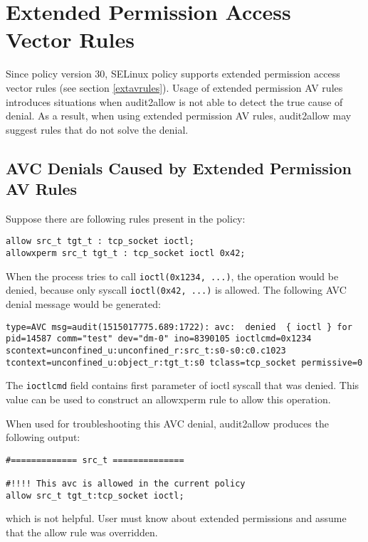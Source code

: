 \section{Extended Permission Access Vector Rules}
Since policy version 30, SELinux policy supports extended permission access
vector rules (see section \ref{extavrules}). Usage of extended permission AV
rules introduces situations when audit2allow is not able to detect the true
cause of denial. As a result, when using extended permission AV rules,
audit2allow may suggest rules that do not solve the denial.

\subsection{AVC Denials Caused by Extended Permission AV Rules}
Suppose there are following rules present in the policy:
\begin{lstlisting}
allow src_t tgt_t : tcp_socket ioctl;
allowxperm src_t tgt_t : tcp_socket ioctl 0x42;
\end{lstlisting}
When the process tries to call \texttt{ioctl(0x1234, ...)}, the operation would
be denied, because only syscall \texttt{ioctl(0x42, ...)} is allowed. The
following AVC denial message would be generated:
\begin{lstlisting}
type=AVC msg=audit(1515017775.689:1722): avc:  denied  { ioctl } for
pid=14587 comm="test" dev="dm-0" ino=8390105 ioctlcmd=0x1234
scontext=unconfined_u:unconfined_r:src_t:s0-s0:c0.c1023
tcontext=unconfined_u:object_r:tgt_t:s0 tclass=tcp_socket permissive=0
\end{lstlisting}
The \texttt{ioctlcmd} field contains first parameter of ioctl syscall that was
denied. This value can be used to construct an allowxperm rule to allow this
operation.

When used for troubleshooting this AVC denial, audit2allow produces the
following output:
\begin{lstlisting}
#============= src_t ==============

#!!!! This avc is allowed in the current policy
allow src_t tgt_t:tcp_socket ioctl;
\end{lstlisting}
which is not helpful. User must know about extended permissions and assume that
the allow rule was overridden.

